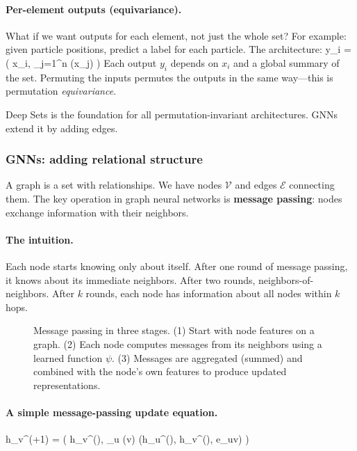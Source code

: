 \documentclass[11pt]{article}
\begin{document}
\paragraph{Per-element outputs (equivariance).} What if we want outputs for each element, not just the whole set? For example: given particle positions, predict a label for each particle. The architecture:
\beq
y_i = \psi\left( x_i, \sum_{j=1}^n \phi(x_j) \right)
\eeq
Each output $y_i$ depends on $x_i$ and a global summary of the set. Permuting the inputs permutes the outputs in the same way---this is permutation \emph{equivariance}.

Deep Sets is the foundation for all permutation-invariant architectures. GNNs extend it by adding edges.

\subsubsection{GNNs: adding relational structure}

A graph is a set with relationships. We have nodes $\mathcal{V}$ and edges $\mathcal{E}$ connecting them. The key operation in graph neural networks is \textbf{message passing}: nodes exchange information with their neighbors.

\paragraph{The intuition.} Each node starts knowing only about itself. After one round of message passing, it knows about its immediate neighbors. After two rounds, neighbors-of-neighbors. After $k$ rounds, each node has information about all nodes within $k$ hops.

\begin{figure}[h]
\centering

\caption{Message passing in three stages. (1) Start with node features on a graph. (2) Each node computes messages from its neighbors using a learned function $\psi$. (3) Messages are aggregated (summed) and combined with the node's own features to produce updated representations.}
\label{fig:gnn_detailed}
\end{figure}

\paragraph{A simple message-passing update equation.}
\beq
h_v^{(\ell+1)} = \phi\left( h_v^{(\ell)}, \sum_{u \in {}(v)} \psi(h_u^{(\ell)}, h_v^{(\ell)}, e_{uv}) \right)
\eeq
\end{document}
